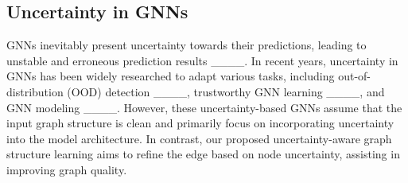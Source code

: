 \subsection{Uncertainty in GNNs}
GNNs inevitably present uncertainty towards their predictions, leading to unstable and erroneous prediction results ____.
In recent years, uncertainty in GNNs has been widely researched to adapt various tasks, including out-of-distribution (OOD) detection ____, trustworthy GNN learning ____, and GNN modeling ____.
However, these uncertainty-based GNNs assume that the input graph structure is clean and primarily focus on incorporating uncertainty into the model architecture.
In contrast, our proposed uncertainty-aware graph structure learning aims to refine the edge based on node uncertainty, assisting in improving graph quality. 
